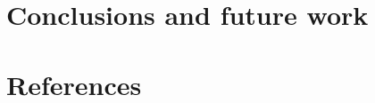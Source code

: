 \documentclass[a4paper]{jpconf}
\begin{document}
\section{Conclusions and future work}
\lipsum[1-2]

\section*{References}


\end{document}
